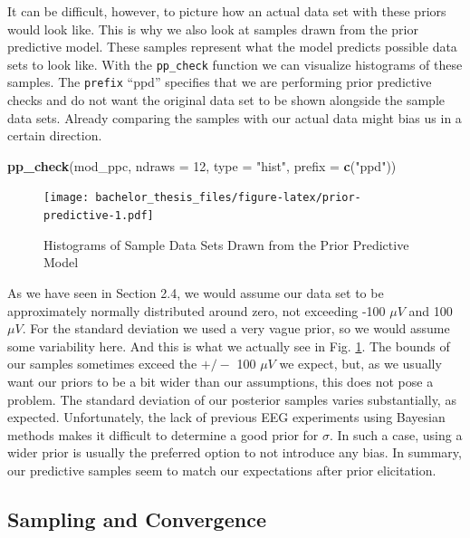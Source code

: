 \documentclass[
  doc,12pt,floatsintext]{apa7}
\newenvironment{Shaded}{\begin{snugshade}}{\end{snugshade}}
\newcommand{\AttributeTok}[1]{\textcolor[rgb]{0.13,0.29,0.53}{#1}}
\newcommand{\DecValTok}[1]{\textcolor[rgb]{0.00,0.00,0.81}{#1}}
\newcommand{\FunctionTok}[1]{\textcolor[rgb]{0.13,0.29,0.53}{\textbf{#1}}}
\newcommand{\NormalTok}[1]{#1}
\newcommand{\StringTok}[1]{\textcolor[rgb]{0.31,0.60,0.02}{#1}}
\begin{document}
It can be difficult, however, to picture how an actual data set with these priors would look like. This is why we also look at samples drawn from the prior predictive model. These samples represent what the model predicts possible data sets to look like. With the \texttt{pp\_check} function we can visualize histograms of these samples. The \texttt{prefix} ``ppd'' specifies that we are performing prior predictive checks and do not want the original data set to be shown alongside the sample data sets. Already comparing the samples with our actual data might bias us in a certain direction.



\begin{Shaded}
\begin{Highlighting}[]
\FunctionTok{pp\_check}\NormalTok{(mod\_ppc, }\AttributeTok{ndraws =} \DecValTok{12}\NormalTok{, }\AttributeTok{type =} \StringTok{"hist"}\NormalTok{, }\AttributeTok{prefix =} \FunctionTok{c}\NormalTok{(}\StringTok{"ppd"}\NormalTok{))}
\end{Highlighting}
\end{Shaded}

\begin{figure}
\centering
\texttt{[image: bachelor\_thesis\_files/figure-latex/prior-predictive-1.pdf]}
\caption{\label{fig:prior-predictive}Histograms of Sample Data Sets Drawn from the Prior Predictive Model}
\end{figure}

As we have seen in Section 2.4, we would assume our data set to be approximately normally distributed around zero, not exceeding -100 \(\mu V\) and 100 \(\mu V\). For the standard deviation we used a very vague prior, so we would assume some variability here. And this is what we actually see in Fig. \ref{fig:prior-predictive}. The bounds of our samples sometimes exceed the \(+/-\) 100 \(\mu V\) we expect, but, as we usually want our priors to be a bit wider than our assumptions, this does not pose a problem. The standard deviation of our posterior samples varies substantially, as expected. Unfortunately, the lack of previous EEG experiments using Bayesian methods makes it difficult to determine a good prior for \(\sigma\). In such a case, using a wider prior is usually the preferred option to not introduce any bias. In summary, our predictive samples seem to match our expectations after prior elicitation.

\subsection{Sampling and Convergence}\label{sampling-and-convergence}
\end{document}
